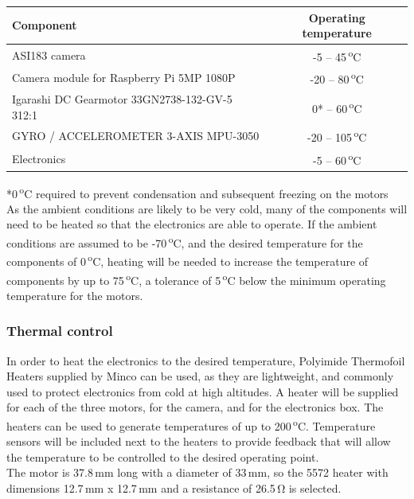 \begin{center}
  \begin{tabular}{ | l | c | }
    \hline
    \textbf{Component} & \textbf{Operating temperature} \\ \hline
    ASI183 camera  & -5 – 45\,\textsuperscript{o}C \\ \hline
    Camera module for Raspberry Pi 5MP 1080P & -20 – 80\,\textsuperscript{o}C \\ \hline
    Igarashi DC Gearmotor 33GN2738-132-GV-5 312:1  & 0* – 60\,\textsuperscript{o}C \\ \hline
    GYRO / ACCELEROMETER 3-AXIS  MPU-3050 & -20 – 105\,\textsuperscript{o}C \\ \hline 
    Electronics  & -5 – 60\,\textsuperscript{o}C \\ \hline
  \end{tabular}
\end{center}

*0\,\textsuperscript{o}C required to prevent condensation and subsequent freezing on the motors\\

As the ambient conditions are likely to be very cold, many of the components will need to be heated so that the electronics are able to operate. If the ambient conditions are assumed to be -70\,\textsuperscript{o}C, and the desired temperature for the components of 0\,\textsuperscript{o}C, heating will be needed to increase the temperature of components by up to  75\,\textsuperscript{o}C, a tolerance of 5\,\textsuperscript{o}C below the minimum operating temperature for the motors.\

\subsubsection{Thermal control}
In order to heat the electronics to the desired temperature, Polyimide Thermofoil Heaters supplied by Minco can be used, as they are lightweight, and commonly used to protect electronics from cold at high altitudes. A heater will be supplied for each of the three motors, for the camera, and for the electronics box. The heaters can be used to generate temperatures of up to 200\,\textsuperscript{o}C. Temperature sensors will be included next to the heaters to provide feedback that will allow the temperature to be controlled to the desired operating point. \\

The motor is 37.8\,mm long with a diameter of 33\,mm, so the 5572 heater with dimensions 12.7\,mm x 12.7\,mm and a resistance of 26.5\,\si{\ohm} is selected.\\

